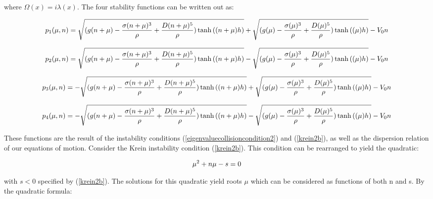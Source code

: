 \documentclass{article}
\begin{document}
where \(\Omega(x) = i\lambda(x)\). The four stability functions can be written out as: 

 \begin{equation} \label{p1}
  \small{p_1(\mu,n) = \sqrt{(g(n+\mu) - \frac{\sigma(n+\mu)^3}{\rho} + \frac{D(n+\mu)^5}{\rho})\tanh{((n+\mu)h)}}   + \sqrt{(g(\mu) - \frac{\sigma(\mu)^3}{\rho} + \frac{D(\mu)^5}{\rho})\tanh{((\mu)h)}} - V_{0}n}
\\
\end{equation}

\begin{equation} \label{p2}
  \small{p_2(\mu,n) = \sqrt{(g(n+\mu) - \frac{\sigma(n+\mu)^3}{\rho} + \frac{D(n+\mu)^5}{\rho})\tanh{((n+\mu)h)}}   - \sqrt{(g(\mu) - \frac{\sigma(\mu)^3}{\rho} + \frac{D(\mu)^5}{\rho})\tanh{((\mu)h)}} - V_{0}n}
\\
\end{equation}

\begin{equation} \label{p3}
  \small{p_3(\mu,n) = - \sqrt{(g(n+\mu) - \frac{\sigma(n+\mu)^3}{\rho} + \frac{D(n+\mu)^5}{\rho})\tanh{((n+\mu)h)}}   + \sqrt{(g(\mu) - \frac{\sigma(\mu)^3}{\rho} + \frac{D(\mu)^5}{\rho})\tanh{((\mu)h)}} - V_{0}n}
\\
\end{equation}

\begin{equation} \label{p4}
  \small{p_4(\mu,n) = - \sqrt{(g(n+\mu) - \frac{\sigma(n+\mu)^3}{\rho} + \frac{D(n+\mu)^5}{\rho})\tanh{((n+\mu)h)}}   - \sqrt{(g(\mu) - \frac{\sigma(\mu)^3}{\rho} + \frac{D(\mu)^5}{\rho})\tanh{((\mu)h)}} - V_{0}n}
\\
\end{equation}

These functions are the result of the instability conditions (\ref{eigenvaluecollisioncondition2}) and (\ref{krein2b}), as well as the dispersion relation of our equations of motion. Consider the Krein instability condition (\ref{krein2b}). This condition can be rearranged to yield the quadratic:

 \begin{equation} \label{mupoly}
   \mu^2 + n \mu - s = 0 
\\
\end{equation}

with \(s<0\) specified by (\ref{krein2b}). The solutions for this quadratic yield roots \(\mu\) which can be considered as functions of both n and s. By the quadratic formula:
\end{document}
